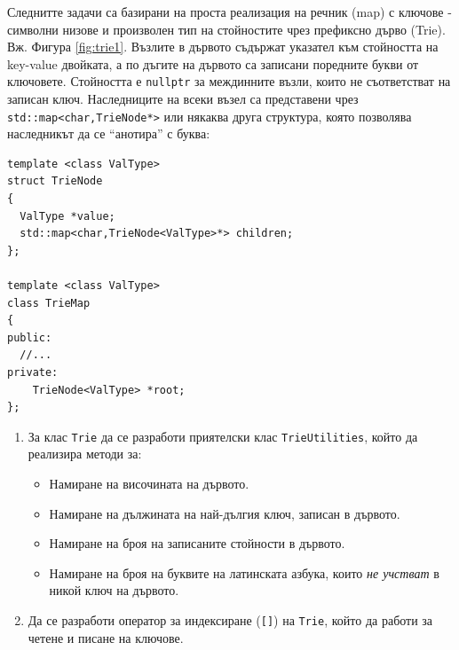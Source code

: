 \documentclass[12pt,a4paper]{article}
\newcommand{\code}[1]{\texttt{#1}}
\begin{document}
\begin{mdframed}[hidealllines=true,backgroundcolor=gray!20]
Следнитте задачи са базирани на проста реализация на речник (map) с ключове - символни низове и произволен тип на стойностите чрез префиксно дърво (Trie). Вж. Фигура \ref{fig:trie1}. Възлите в дървото съдържат указател към стойността на key-value двойката, а по дъгите на дървото са записани поредните букви от ключовете. Стойността е \code{nullptr} за междинните възли, които не съответстват на записан ключ. Наследниците на всеки възел са представени чрез \code{std::map<char,TrieNode*>} или някаква друга структура, която позволява наследникът да се ``анотира'' с буква:
\begin{verbatim}
template <class ValType>
struct TrieNode
{
  ValType *value;
  std::map<char,TrieNode<ValType>*> children;
};

template <class ValType>
class TrieMap
{
public:
  //...
private:
    TrieNode<ValType> *root;
};
\end{verbatim}
\end{mdframed}

\begin{enumerate}[resume]

	\item За клас \texttt{Trie} да се разработи приятелски клас \texttt{TrieUtilities}, който да реализира методи за:

	\begin{itemize}
		\item Намиране на височината на дървото.
		\item Намиране на дължината на най-дългия ключ, записан в дървото.
		\item Намиране на броя на записаните стойности в дървото.
		\item Намиране на броя на буквите на латинската азбука, които \emph{не учстват} в никой ключ на дървото.
	\end{itemize}

  \item Да се разработи оператор за индексиране (\texttt{[]}) на \texttt{Trie}, който да работи за четене и писане на ключове.




\end{enumerate}



\pagebreak

\begin{thebibliography}{99}


\end{thebibliography}
\end{document}
